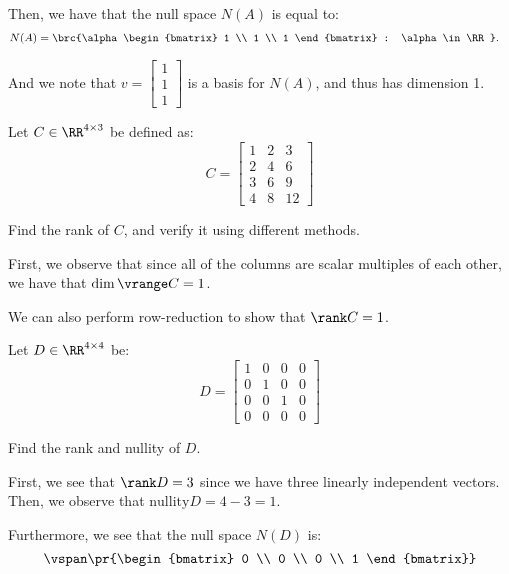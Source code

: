 \documentclass[openany]{book}
\begin{document}
\begin{solution}
	Then, we have that the null space $N(A)$ is equal to:
	\begin{align*}
		N(A) &= \brc{\alpha\begin{bmatrix}
				1 \\ 1 \\ 1
		\end{bmatrix} : \alpha \in \RR}.
	\end{align*}
	
And we note that $v = \begin{bmatrix}
	1 \\ 1 \\1
\end{bmatrix}$ is a basis for $N(A)$, and thus has dimension 1.
\end{solution}

\begin{hw}
	Let $C \in \RR^{4 \times 3}$ be defined as:
	\begin{equation*}
		C = \begin{bmatrix}
			 1 & 2 & 3 \\ 2 & 4 & 6 \\ 3 & 6 & 9 \\ 4 & 8 & 12
		\end{bmatrix}
	\end{equation*}

	Find the rank of $C$, and verify it using different methods.
\end{hw}
\begin{solution}
	First, we observe that since all of the columns are scalar multiples of each other, we have that $\dim \vrange C = 1$.
	
	We can also perform row-reduction to show that $\rank C = 1$.
\end{solution}

\begin{hw}
	Let $D \in \RR^{4 \times 4}$ be:
	\begin{equation*}
		D = \begin{bmatrix}
			1 & 0 & 0 & 0 \\
			0 & 1 & 0 & 0 \\
			0 & 0 & 1 & 0 \\
			0 & 0 & 0 & 0
		\end{bmatrix}
	\end{equation*}

	Find the rank and nullity of $D$.
\end{hw}
\begin{solution}
	First, we see that $\rank D = 3$ since we have three linearly independent vectors. Then, we observe that $\mathrm{nullity} D = 4 - 3 = 1$.
	
	Furthermore, we see that the null space $N(D)$ is:
	\begin{equation*}
		\vspan\pr{\begin{bmatrix}
				0 \\ 0 \\ 0 \\ 1
		\end{bmatrix}}
	\end{equation*}
\end{solution}
\end{document}
